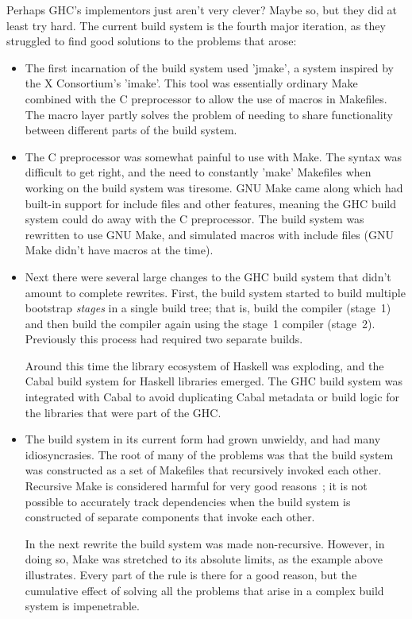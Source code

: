 Perhaps GHC's implementors just aren't very clever?  Maybe so, but
they did at least try hard. The current build system is the
fourth major iteration, as they struggled to find good solutions to the
problems that arose:
\vspace{-1mm}
\begin{itemize}
\item The first incarnation of the build system used \lst'jmake', a
  system inspired by the X Consortium's \lst'imake'.  This tool was
  essentially ordinary Make combined with the C preprocessor to
  allow the use of macros in Makefiles.  The macro layer partly
  solves the problem of needing to share functionality between
  different parts of the build system.

\item The C preprocessor was somewhat painful to use with Make.
  The syntax was difficult to get right, and the need to constantly
  \lst'make' Makefiles when working on the build system was tiresome.  GNU
  Make came along which had built-in support for include files and
  other features, meaning the GHC build system could do away with the C
  preprocessor. The build system was rewritten to use GNU Make, and
  simulated macros with include files (GNU Make didn't have macros at
  the time).

\item Next there were several large changes to the GHC build system
  that didn't amount to complete rewrites.  First, the build system started
  to build multiple bootstrap \emph{stages} in a single build tree; that is,
  build the compiler (stage~1) and then build the compiler again using the
  stage~1 compiler (stage~2). Previously this process had required two separate builds.

  Around this time the library ecosystem of Haskell was exploding, and
  the Cabal build system for Haskell libraries emerged. The GHC build system was
  integrated with Cabal to avoid duplicating Cabal metadata or build logic for
  the libraries that were part of the GHC.

\item The build system in its current form had grown unwieldy, and had
  many idiosyncrasies. The root of many of the problems was that the
  build system was constructed as a set of Makefiles that recursively
  invoked each other. Recursive Make is considered harmful
  for very good reasons~\cite{miller:recursive_make}; it is not possible to
  accurately track dependencies when the build system is constructed
  of separate components that invoke each other.

  In the next rewrite the build system was made non-recursive.
  However, in doing so, Make was stretched to its absolute
  limits, as the example above illustrates. Every part of the rule is
  there for a good reason, but the cumulative effect of solving all
  the problems that arise in a complex build system is impenetrable.
\end{itemize}
